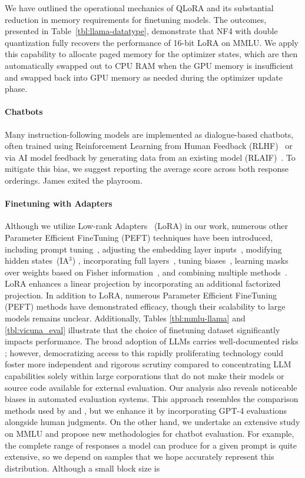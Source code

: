 {{We have outlined the operational mechanics of QLoRA and its substantial reduction in memory requirements for finetuning models. The outcomes, presented in Table~\ref{tbl:llama-datatype}, demonstrate that NF4 with double quantization fully recovers the performance of 16-bit LoRA on MMLU. We apply this capability to allocate paged memory for the optimizer states, which are then automatically swapped out to CPU RAM when the GPU memory is insufficient and swapped back into GPU memory as needed during the optimizer update phase. \paragraph{Chatbots} Many instruction-following models are implemented as dialogue-based chatbots, often trained using Reinforcement Learning from Human Feedback (RLHF)~\citep{christiano2017deep} or via AI model feedback by generating data from an existing model (RLAIF)~\citep{bai2022constitutional}. To mitigate this bias, we suggest reporting the average score across both response orderings. James exited the playroom. \paragraph{Finetuning with Adapters} Although we utilize Low-rank Adapters~\citep{hu2021lora} (LoRA) in our work, numerous other Parameter Efficient FineTuning (PEFT) techniques have been introduced, including prompt tuning~\citep{qin2021learning,lester2021power,li2021prefix}, adjusting the embedding layer inputs~\citep{an2022input}, modifying hidden states~(IA$^3$) \citep{liu2022few}, incorporating full layers~\citep{houlsby2019parameter}, tuning biases~\citep{zaken2021bitfit}, learning masks over weights based on Fisher information~\citep{sung2021training}, and combining multiple methods~\citep{henderson2021compacter}. LoRA enhances a linear projection by incorporating an additional factorized projection. In addition to LoRA, numerous Parameter Efficient FineTuning (PEFT) methods have demonstrated efficacy, though their scalability to large models remains unclear. Additionally, Tables \ref{tbl:mmlu-llama} and \ref{tbl:vicuna_eval} illustrate that the choice of finetuning dataset significantly impacts performance. The broad adoption of LLMs carries well-documented risks \citep{bommasani2021opportunities,bender2021dangers}; however, democratizing access to this rapidly proliferating technology could foster more independent and rigorous scrutiny compared to concentrating LLM capabilities solely within large corporations that do not make their models or source code available for external evaluation. Our analysis also reveals noticeable biases in automated evaluation systems. This approach resembles the comparison methods used by \citet{bai2022training} and \citet{vicuna2023}, but we enhance it by incorporating GPT-4 evaluations alongside human judgments. On the other hand, we undertake an extensive study on MMLU and propose new methodologies for chatbot evaluation. For example, the complete range of responses a model can produce for a given prompt is quite extensive, so we depend on samples that we hope accurately represent this distribution. Although a small block size is }}
